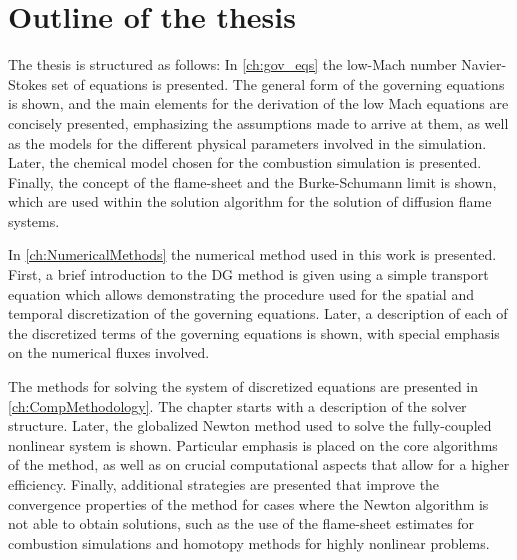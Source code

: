 \section{Outline of the thesis}

The thesis is structured as follows: In \cref{ch:gov_eqs} the low-Mach number Navier-Stokes set of equations is presented. The general form of the governing equations is shown, and the main elements for the derivation of the low Mach equations are concisely presented, emphasizing the assumptions made to arrive at them, as well as the models for the different physical parameters involved in the simulation. Later, the chemical model chosen for the combustion simulation is presented. Finally, the concept of the flame-sheet and the Burke-Schumann limit is shown, which are used within the solution algorithm for the solution of diffusion flame systems.

In \cref{ch:NumericalMethods} the numerical method used in this work is presented. First, a brief introduction to the DG method is given using a simple transport equation which allows demonstrating the procedure used for the spatial and temporal discretization of the governing equations. Later, a description of each of the discretized terms of the governing equations is shown, with special emphasis on the numerical fluxes involved.

The methods for solving the system of discretized equations are presented in \cref{ch:CompMethodology}. The chapter starts with a description of the solver structure. Later, the globalized Newton method used to solve the fully-coupled nonlinear system is shown. Particular emphasis is placed on the core algorithms of the method, as well as on crucial computational aspects that allow for a higher efficiency. Finally, additional strategies are presented that improve the convergence properties of the method for cases where the Newton algorithm is not able to obtain solutions, such as the use of the flame-sheet estimates for combustion simulations and homotopy methods for highly nonlinear problems.

